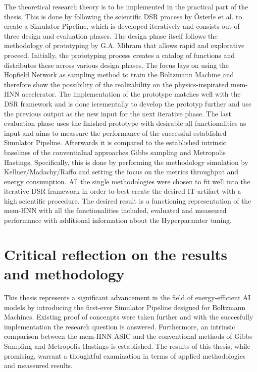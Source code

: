 The theoretical research theory is to be implemented in the practical part of the thesis.
This is done by following the scientific \ac{DSR} process by Österle et al. to create a Simulator Pipeline,
which is developed iteratively and consists out of three design and evaluation phases. 
The design phase itself follows the methodology of prototyping by G.A. Mihram that allows rapid and explorative proceed.
Initially, the prototyping process creates a catalog of functions and distributes these across various design phases.
The focus lays on using the Hopfield Network as sampling method to train the Boltzmann Machine
and therefore show the possibility of the realizability on the physics-inspirated \ac{mem-HNN} accelerator.
The implementation of the prototype matches well with the \ac{DSR} framework and is done icrementally to develop the prototyp further and use the previous output as
the new input for the next iterative phase.   
The last evaluation phase uses the finished prototype with desirable all functionalities as input and 
aims to meassure the performance of the successful established Simulator Pipeline. 
Afterwards it is compared to the established intrinsic baselines
of the conventialnal approaches Gibbs sampling and Metropolis Hastings.
Specifically, this is done by performing the methodology simulation by Kellner/Madachy/Raffo and setting the focus on 
the metrics throughput and energy consumption. 
All the single methodologies were chosen to fit well into the iterative \ac{DSR} framework in order to best 
create the desired \ac{IT}-artifact with a high scientific procedure.
The desired result is a functioning representation of the \ac{mem-HNN} with all the functionalities included, 
evaluated and meassured performance with additional information about the Hyperparamter tuning.

\section{Critical reflection on the results and methodology}

This thesis represents a significant advancement in the field of energy-efficient AI models by introducing the first-ever Simulator Pipeline designed for Boltzmann Machines.
Existing proof of concenpts were taken further and with the succesfully implementation the research question is answered.
Furthermore, an intrinsic comparison between the \ac{mem-HNN} \ac{ASIC} and the conventional methods of Gibbs Sampling and Metropolis Hastings is established.
The results of this thesis, while promising, warrant a thoughtful examination in terms of applied methodologies and meassured results.

